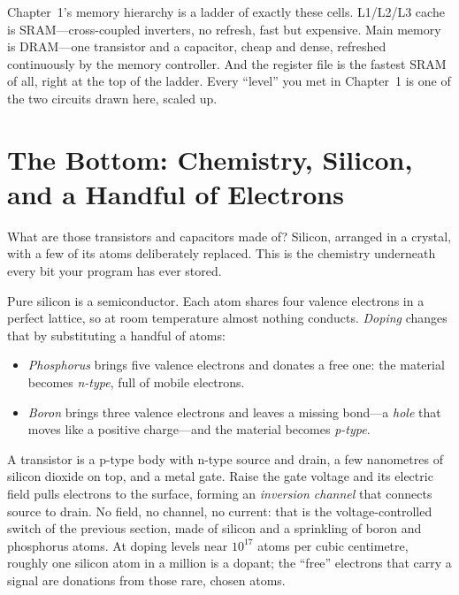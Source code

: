\begin{insight}
Chapter~1's memory hierarchy is a ladder of exactly these cells.
L1/L2/L3 cache is SRAM---cross-coupled inverters, no refresh, fast
but expensive. Main memory is DRAM---one transistor and a capacitor,
cheap and dense, refreshed continuously by the memory controller.
And the register file is the fastest SRAM of all, right at the top
of the ladder. Every ``level'' you met in Chapter~1 is one of the two
circuits drawn here, scaled up.
\end{insight}

\section{The Bottom: Chemistry, Silicon, and a Handful of Electrons}
\label{sec:chemistry}

What are those transistors and capacitors made of? Silicon, arranged
in a crystal, with a few of its atoms deliberately replaced. This is
the chemistry underneath every bit your program has ever stored.

Pure silicon is a semiconductor. Each atom shares four valence
electrons in a perfect lattice, so at room temperature almost nothing
conducts. \emph{Doping} changes that by substituting a handful of
atoms:

\begin{itemize}
  \item \emph{Phosphorus} brings five valence electrons and donates
    a free one: the material becomes \emph{n-type}, full of mobile
    electrons.
  \item \emph{Boron} brings three valence electrons and leaves a
    missing bond---a \emph{hole} that moves like a positive
    charge---and the material becomes \emph{p-type}.
\end{itemize}

A transistor is a p-type body with n-type source and drain, a few
nanometres of silicon dioxide on top, and a metal gate. Raise the
gate voltage and its electric field pulls electrons to the surface,
forming an \emph{inversion channel} that connects source to drain.
No field, no channel, no current: that is the voltage-controlled
switch of the previous section, made of silicon and a sprinkling of
boron and phosphorus atoms. At doping levels near $10^{17}$ atoms per
cubic centimetre, roughly one silicon atom in a million is a dopant;
the ``free'' electrons that carry a signal are donations from those
rare, chosen atoms.

